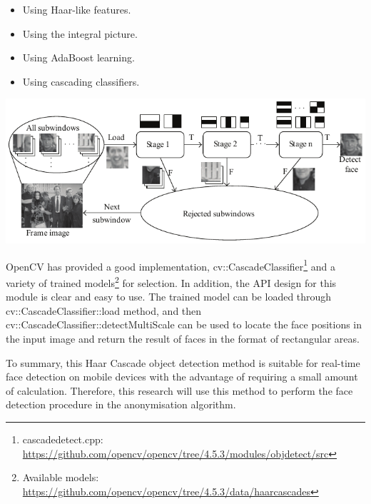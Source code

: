 \begin{minipage}{\textwidth}
    \begin{minipage}{.4\textwidth}
        \begin{itemize}
            \item Using Haar-like features.
            \item Using the integral picture.
            \item Using AdaBoost learning.
            \item Using cascading classifiers.
        \end{itemize}
    \end{minipage}
    \begin{minipage}{.58\textwidth}
        \centering
        \captionsetup{type=figure}
        \includegraphics[width=\textwidth]{design/imgs/ext-haar-arch.pdf}
        \label{fig:ext-haar-arch}
    \end{minipage}
\end{minipage}

OpenCV has provided a good implementation, cv::CascadeClassifier\footnote{cascadedetect.cpp: \url{https://github.com/opencv/opencv/tree/4.5.3/modules/objdetect/src}} and a variety of trained models\footnote{Available models: \url{https://github.com/opencv/opencv/tree/4.5.3/data/haarcascades}} for selection.
In addition, the API design for this module is clear and easy to use.
The trained model can be loaded through cv::CascadeClassifier::load method, and then cv::CascadeClassifier::detectMultiScale can be used to locate the face positions in the input image and return the result of faces in the format of rectangular areas.

To summary, this Haar Cascade object detection method is suitable for real-time face detection on mobile devices with the advantage of requiring a small amount of calculation. 
Therefore, this research will use this method to perform the face detection procedure in the anonymisation algorithm.

